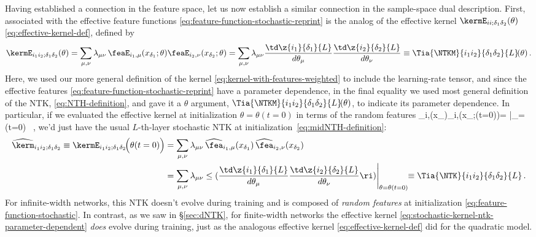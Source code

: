 Having established a connection in the feature space, let us now establish a similar connection in the sample-space dual description. First, associated with the effective feature functions  \eqref{eq:feature-function-stochastic-reprint} is the analog of the effective kernel $\kermE_{ii;\delta_1 \delta_2 }(\theta)$ \eqref{eq:effective-kernel-def}, defined by
\begin{align}\label{eq:stochastic-kernel-ntk-parameter-dependent}
\kermE_{i_1i_2;\delta_1\delta_2}(\theta)=  \sum_{\mu,\nu}\lambda_{\mu\nu}\, \feaE_{i_1,\mu}(x_{\delta_1};\theta) \feaE_{i_2,\nu}(x_{\delta_2};\theta)=\sum_{\mu,\nu}\lambda_{\mu\nu}\frac{\td \z{i_1}{\delta_1}{L}}{d \theta_\mu}\frac{\td \z{i_2}{\delta_2}{L}}{d \theta_\nu} \equiv \Tia{\NTKM}{i_1i_2}{\delta_1\delta_2}{L}\!(\theta)\, .
\end{align}
Here, we used our more general definition of the kernel \eqref{eq:kernel-with-features-weighted} to include the learning-rate tensor, and 
since the effective features \eqref{eq:feature-function-stochastic-reprint} have a parameter dependence, in the final equality we used most general definition of the NTK, \eqref{eq:NTH-definition}, and gave it a $\theta$ argument, $\Tia{\NTKM}{i_1i_2}{\delta_1\delta_2}{L}\!(\theta)$, to indicate its parameter dependence.
In particular, if we evaluated the effective kernel at initialization $\theta = \theta(t=0)$ in terms of the random features
\be\label{eq:stochastic-feature-at-init-reprint}
\widehat{\fea}_{i,\mu}(x_{\delta})\equiv \feaE_{i,\mu}\Big(x_{\delta};\theta(t=0)\Big)= \Bigg|_{\theta=\theta(t=0) }\, ,
\ee
we'd just have the usual $L$-th-layer stochastic NTK at initialization~\eqref{eq:midNTH-definition}:
\begin{align}\label{eq:stochastic-kernel-ntk-reprint}
 \widehat{\kerm}_{i_1i_2;\delta_1\delta_2}\equiv \kermE_{i_1i_2;\delta_1\delta_2}\!\Big(\theta(t=0)\Big)&=  \sum_{\mu,\nu}\lambda_{\mu\nu}\, \widehat{\fea}_{i_1,\mu}(x_{\delta_1}) \, \widehat{\fea}_{i_2,\nu}(x_{\delta_2}) \, \\
 &=\sum_{\mu,\nu}\lambda_{\mu\nu}\le( \frac{\td \z{i_1}{\delta_1}{L}}{d \theta_\mu}\frac{\td \z{i_2}{\delta_2}{L}}{d \theta_\nu}\ri)\Bigg|_{\theta=\theta(t=0) }\!\!\equiv \Tia{\NTK}{i_1i_2}{\delta_1\delta_2}{L}\, . \notag
 \end{align}
For infinite-width networks, this NTK doesn't evolve during training and is composed of \emph{random features} at initialization \eqref{eq:feature-function-stochastic}.
In contrast, as we saw in \S\ref{sec:dNTK}, for finite-width networks the effective kernel \eqref{eq:stochastic-kernel-ntk-parameter-dependent} \emph{does} evolve during training, just as the analogous effective kernel \eqref{eq:effective-kernel-def} did for the quadratic model. 











